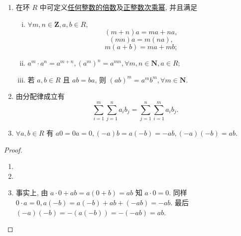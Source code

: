 \documentclass[../../main.tex]{subfiles}
\begin{document}
\begin{theorem}[环的基本性质]\label{theorem:环的基本性质}
\begin{enumerate}[(1)]
\item 在环 \( R \) 中可定义\hyperref[definition:倍数的定义]{任何整数的倍数}及\hyperref[definition:n次乘幂]{正整数次乘幂}, 并且满足
\begin{enumerate}[(i)]
\item \( \forall m,n \in \mathbf{Z}, a,b \in R \),
\[
(m + n)a = ma + na,
\]
\[
(mn)a = m(na),
\]
\[
m(a + b) = ma + mb;
\]
\item \( a^m \cdot a^n = a^{m+n}, (a^m)^n = a^{mn}, \forall m,n \in \mathbf{N}, a \in R \);
\item 若 \( a,b \in R \) 且 \( ab = ba \), 则 \( (ab)^m = a^m b^m, \forall m \in \mathbf{N} \).
\end{enumerate}

\item 由分配律成立有
\[
\sum_{i=1}^m \sum_{j=1}^n a_i b_j = \sum_{j=1}^n \sum_{i=1}^m a_i b_j.
\]

\item \( \forall a,b \in R \) 有 \( a0 = 0a = 0, (-a)b = a(-b) = -ab, (-a)(-b) = ab \).
\end{enumerate}
\end{theorem}
\begin{proof}
\begin{enumerate}[(1)]
\item 

\item 

\item 事实上, 由 \( a \cdot 0 + ab = a(0 + b) = ab \) 知 \( a \cdot 0 = 0 \). 同样 \( 0 \cdot a = 0, a(-b) = a(-b) + ab + (-ab) = -ab \). 最后 \( (-a)(-b) = -(a(-b)) = -(-ab) = ab \).
\end{enumerate}
\end{proof}
\end{document}

